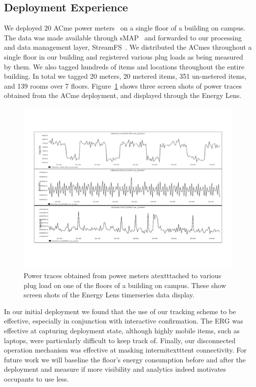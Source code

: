\subsection{Deployment Experience}
\label{sec:eval}

We deployed 20 ACme power meters~\cite{acme} on a single floor of a building on campus.  The data was made available through
sMAP~\cite{smap} and forwarded to our processing and data management layer, StreamFS~\cite{streamfs}.  We distributed
the ACmes throughout a single floor in our building and registered various plug loads as being measured by them.  We also tagged
hundreds of items and locations throughout the entire building.  In total we tagged 20 meters, 20 metered items, 351 un-metered items,
 and 139 rooms over 7 floors.  Figure~\ref{fig:tsdata} shows three screen shots of power traces obtained from the ACme deployment, and displayed
 through the Energy Lens. 

\begin{figure}[htb!]
\begin{center}
\includegraphics[scale=0.33]{figs/graphs_screen}
\caption{Power traces obtained from power meters atextttached to various plug load on one of the floors of
a building on campus.  These show screen shots of the Energy Lens timerseries data display.}
\label{fig:tsdata}
\end{center}
\end{figure}

In our initial deployment we found that the use of our tracking scheme to be effective, especially in conjunction with
interactive confirmation.  The ERG was effective at capturing deployment state, although highly mobile items, such as laptops,
were particularly difficult to keep track of.  Finally, our disconnected operation mechanism was effective at masking 
intermitextttent connectivity.  For future work we will baseline the floor's energy consumption before and after the deployment 
and measure if more visibility and analytics indeed motivates occupants to use less.


